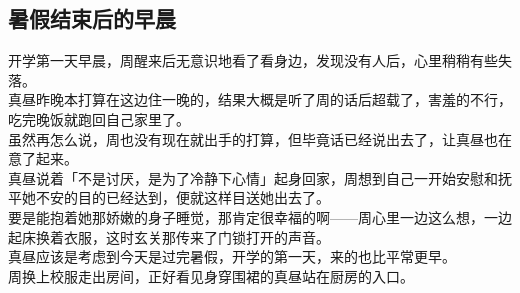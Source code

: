\subsection{暑假结束后的早晨}

开学第一天早晨，周醒来后无意识地看了看身边，发现没有人后，心里稍稍有些失落。\\

真昼昨晚本打算在这边住一晚的，结果大概是听了周的话后超载了，害羞的不行，吃完晚饭就跑回自己家里了。\\

虽然再怎么说，周也没有现在就出手的打算，但毕竟话已经说出去了，让真昼也在意了起来。\\

真昼说着「不是讨厌，是为了冷静下心情」起身回家，周想到自己一开始安慰和抚平她不安的目的已经达到，便就这样目送她出去了。\\

要是能抱着她那娇嫩的身子睡觉，那肯定很幸福的啊——周心里一边这么想，一边起床换着衣服，这时玄关那传来了门锁打开的声音。\\

真昼应该是考虑到今天是过完暑假，开学的第一天，来的也比平常更早。\\

周换上校服走出房间，正好看见身穿围裙的真昼站在厨房的入口。\\

